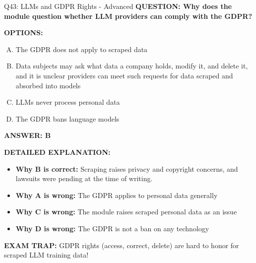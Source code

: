 \documentclass[8pt]{beamer}
\begin{document}
\begin{frame}[shrink=6]{Q43: LLMs and GDPR Rights - Advanced}
\fontsize{6.5}{7.5}\selectfont
\textbf{QUESTION: Why does the module question whether LLM providers can comply with the GDPR?}

\vspace{0.1cm}
\textbf{OPTIONS:}
\begin{enumerate}[A.]
\item The GDPR does not apply to scraped data
\item Data subjects may ask what data a company holds, modify it, and delete it, and it is unclear providers can meet such requests for data scraped and absorbed into models
\item LLMs never process personal data
\item The GDPR bans language models
\end{enumerate}

\vspace{0.1cm}
\textcolor{myblue}{\textbf{ANSWER: B}}

\vspace{0.1cm}
\textbf{DETAILED EXPLANATION:}
\begin{itemize}
\item \textbf{Why B is correct:} Scraping raises privacy and copyright concerns, and lawsuits were pending at the time of writing.
\item \textbf{Why A is wrong:} The GDPR applies to personal data generally
\item \textbf{Why C is wrong:} The module raises scraped personal data as an issue
\item \textbf{Why D is wrong:} The GDPR is not a ban on any technology
\end{itemize}

\textcolor{myred}{\textbf{EXAM TRAP:}} GDPR rights (access, correct, delete) are hard to honor for scraped LLM training data!
\end{frame}

\end{document}
